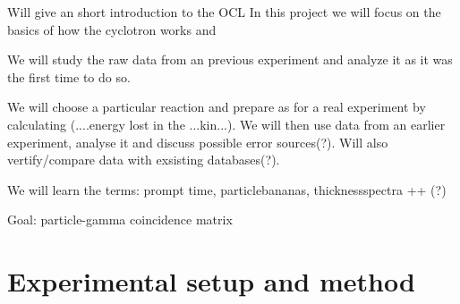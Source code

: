 \documentclass[11pt,a4wide]{article}
\begin{document}
Will give an short introduction to the OCL
In this project we will focus on the basics of how the cyclotron works and 

We will study the raw data from an previous experiment and analyze it as it was the first time to do so. 




We will choose a particular reaction and prepare as for a real experiment by calculating (....energy lost in the ...kin...). We will then use data from an earlier experiment, analyse it and discuss possible error sources(?). Will also vertify/compare data with exsisting databases(?).

We will learn the terms: prompt time, particlebananas, thicknessspectra ++ (?)

Goal: particle-gamma coincidence matrix




\section{Experimental setup and method}
\end{document}

